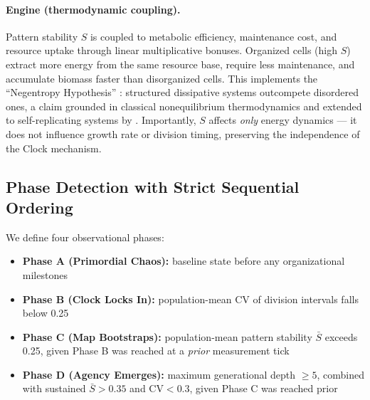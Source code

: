 \documentclass[11pt,letterpaper]{article}
\begin{document}
\paragraph{Engine (thermodynamic coupling).} Pattern stability $S$ is coupled to metabolic efficiency, maintenance cost, and resource uptake through linear multiplicative bonuses. Organized cells (high $S$) extract more energy from the same resource base, require less maintenance, and accumulate biomass faster than disorganized cells. This implements the ``Negentropy Hypothesis'' \citep{farina2025engine}: structured dissipative systems outcompete disordered ones, a claim grounded in classical nonequilibrium thermodynamics \citep{prigogine1984order,kondepudi1998modern} and extended to self-replicating systems by \citet{england2013statistical}. Importantly, $S$ affects \emph{only} energy dynamics --- it does not influence growth rate or division timing, preserving the independence of the Clock mechanism.

\subsection{Phase Detection with Strict Sequential Ordering}

We define four observational phases:
\begin{itemize}
  \item \textbf{Phase A (Primordial Chaos):} baseline state before any organizational milestones
  \item \textbf{Phase B (Clock Locks In):} population-mean CV of division intervals falls below 0.25
  \item \textbf{Phase C (Map Bootstraps):} population-mean pattern stability $\bar{S}$ exceeds 0.25, given Phase B was reached at a \emph{prior} measurement tick
  \item \textbf{Phase D (Agency Emerges):} maximum generational depth $\geq 5$, combined with sustained $\bar{S} > 0.35$ and $\mathrm{CV} < 0.3$, given Phase C was reached prior
\end{itemize}
\end{document}

